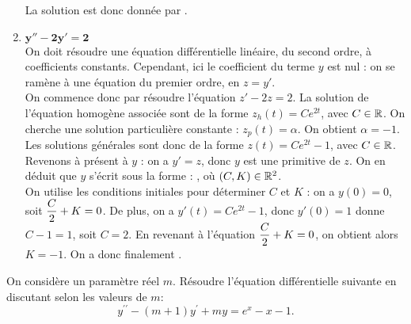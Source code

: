 \documentclass[a4paper, 11pt,reqno]{article}
\begin{document}
\begin{correction}
\begin{enumerate}
          La solution est donc donn\'ee par  .
    \item $\mathbf{y''-2y'=2}$\\
          On doit r\'esoudre une \'equation diff\'erentielle lin\'eaire, du second ordre, \`a coefficients constants. Cependant, ici le coefficient du terme $y$ est nul : on se ram\`ene \`a une \'equation du premier ordre, en $z=y'$.\\
          On commence donc par r\'esoudre l'\'equation $z'-2z=2$. La solution de l'\'equation homog\`ene associ\'ee sont de la forme $z_h(t) = Ce^{2t}$, avec $C\in \mathbb{R}$. On cherche une solution particuli\`ere constante : $z_p(t) = \alpha$. On obtient $\alpha = -1$. Les solutions g\'en\'erales sont donc de la forme $z(t) = Ce^{2t}-1$, avec $C \in \mathbb{R}$.\\
          Revenons \`a pr\'esent \`a $y$ : on a $y'=z$, donc $y$ est une primitive de $z$. On en d\'eduit que $y$ s'\'ecrit sous la forme : , o\`u $(C,K) \in \mathbb{R}^2$.\\
          On utilise les conditions initiales pour d\'eterminer $C$ et $K$ : on a $y(0)=0$, soit $\displaystyle \frac{C}{2} +K = 0$. De plus, on a $y'(t) = C e^{2t} -1$, donc $y'(0)=1$ donne $C-1 = 1$, soit $C=2$. En revenant \`a l'\'equation $\displaystyle \frac{C}{2} +K = 0$, on obtient alors $K = -1$. On a donc finalement .
  \end{enumerate}
\end{correction}



\begin{exercice}  \;
  On consid\`ere un param\`etre r\'eel $m$. R\'esoudre l'\'equation diff\'erentielle suivante en discutant selon les valeurs de $m$:
  $$y^{\prime\prime}-(m+1)y^{\prime}+my=e^x-x-1.$$
\end{exercice}
\end{document}
